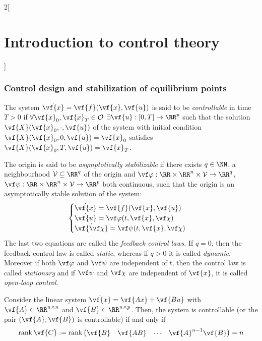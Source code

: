 \documentclass[../../../main_math.tex]{subfiles}
\begin{document}
\begin{multicols}{2}[\section{Introduction to control theory}]
  \subsubsection{Control design and stabilization of equilibrium points}
  \begin{definition}
    The system $\dot{\vf{x}} = \vf{f}(\vf{x}, \vf{u})$ is said to be \emph{controllable} in time $T>0$ if $\forall \vf{x}_0, \vf{x}_T\in \mathcal{O}$ $\exists \vf{u}: [0, T]\to \RR^p$ such that the solution $\vf{X}(\vf{x}_0,\cdot, \vf{u})$ of the system with initial condition $\vf{X}(\vf{x}_0, 0,\vf{u}) = \vf{x}_0$ satisfies $\vf{X}(\vf{x}_0, T,\vf{u}) = \vf{x}_T$.
  \end{definition}
  \begin{definition}
    The origin is said to be \emph{asymptotically stabilizable} if there exists $q\in \NN$, a neighbourhood $\mathcal{V}\subseteq \RR^q$ of the origin and $\vf\varphi:\RR\times\RR^n\times\mathcal{V}\to \RR^q$, $\vf\psi:\RR\times\RR^n\times\mathcal{V}\to \RR^p$ both continuous, such that the origin is an asymptotically stable solution of the system:
    \begin{equation}\label{ICT:augmented_system}
      \begin{cases}
        \dot{\vf{x}} = \vf{f}(\vf{x}, \vf{u})         \\
        \dot{\vf{u}} = \vf\varphi(t, \vf{x}, \vf\chi) \\
        \dot{\vf{\vf\chi}} = \vf\psi(t, \vf{x}, \vf\chi)
      \end{cases}
    \end{equation}
    The last two equations are called the \emph{feedback control laws}. If $q=0$, then the feedback control law is called \emph{static}, whereas if $q>0$ it is called \emph{dynamic}. Moreover if both $\vf\varphi$ and $\vf\psi$ are independent of $t$, then the control law is called \emph{stationary} and if $\vf\psi$ and $\vf\chi$ are independent of $\vf{x}$, it is called \emph{open-loop control}.
  \end{definition}
  \begin{theorem}
    Consider the linear system $\dot{\vf{x}} = \vf{Ax} + \vf{Bu}$ with $\vf{A}\in \RR^{n\times n}$ and $\vf{B}\in \RR^{n\times p}$. Then, the system is controllable (or the pair $(\vf{A},\vf{B})$ is controllable) if and only if
    $$
      \rank\vf{C}:=\rank\begin{pmatrix} \vf{B} & \vf{AB} & \cdots & \vf{A}^{n-1}\vf{B} \end{pmatrix} = n
$$
\end{theorem}
\end{multicols}
\end{document}
